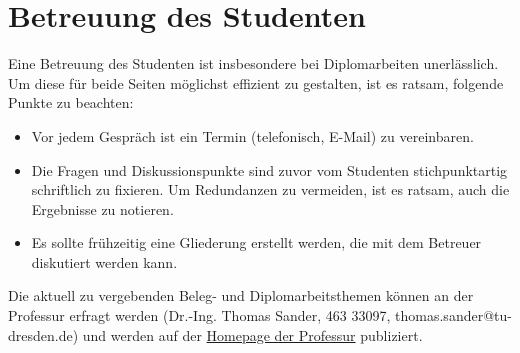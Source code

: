 \chapter{Betreuung des Studenten}\thispagestyle{fancy}

Eine Betreuung des Studenten ist insbesondere bei Diplomarbeiten unerlässlich. Um diese für beide Seiten möglichst effizient zu gestalten, ist es ratsam, folgende Punkte zu beachten:

\begin{itemize}
\item Vor jedem Gespräch ist ein Termin (telefonisch, E-Mail) zu vereinbaren. 
\item Die Fragen und Diskussionspunkte sind zuvor vom Studenten stichpunktartig schriftlich zu fixieren. Um Redundanzen zu vermeiden, ist es ratsam, auch die Ergebnisse zu notieren. 
\item Es sollte frühzeitig eine Gliederung erstellt werden, die mit dem Betreuer diskutiert werden kann. 
\end{itemize}

Die aktuell zu vergebenden Beleg- und Diplomarbeitsthemen können an der Professur erfragt werden (Dr.-Ing. Thomas Sander, 463 33097, thomas.sander@tu-dresden.de) und werden auf der \href{http://tu-dresden.de/die_tu_dresden/fakultaeten/fakultaet_maschinenwesen/iet/ew/beleg_da_arbeiten}{Homepage der Professur} publiziert.